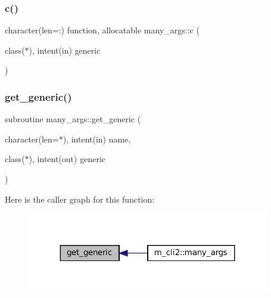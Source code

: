 \subsubsection{\texorpdfstring{c()}{c()}}
{\footnotesize\ttfamily character(len=\+:) function, allocatable many\+\_\+args\+::c (\begin{DoxyParamCaption}\item[{class($\ast$), intent(in)}]{generic }\end{DoxyParamCaption})\hspace{0.3cm}{\ttfamily [private]}}

\mbox{\label{M__CLI2_8f90_a63bc2e1acc64ef4241b6419c18d80877}} 
\subsubsection{\texorpdfstring{get\+\_\+generic()}{get\_generic()}}
{\footnotesize\ttfamily subroutine many\+\_\+args\+::get\+\_\+generic (\begin{DoxyParamCaption}\item[{character(len=$\ast$), intent(in)}]{name,  }\item[{class($\ast$), intent(out)}]{generic }\end{DoxyParamCaption})\hspace{0.3cm}{\ttfamily [private]}}

Here is the caller graph for this function\+:
\nopagebreak
\begin{figure}[H]
\begin{center}
\leavevmode
\includegraphics[width=299pt]{M__CLI2_8f90_a63bc2e1acc64ef4241b6419c18d80877_icgraph}
\end{center}
\end{figure}
\mbox{\label{M__CLI2_8f90_aa26f90016621d1ee43d3b5b66316532b}} 

